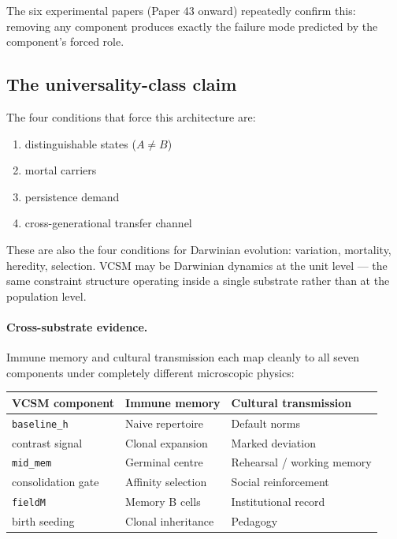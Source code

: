 \documentclass[11pt]{article}
\begin{document}
The six experimental papers (Paper 43 onward) repeatedly confirm this: removing
any component produces exactly the failure mode predicted by the component's forced role.

\subsection{The universality-class claim}

The four conditions that force this architecture are:
\begin{enumerate}
  \item distinguishable states ($A \neq B$)
  \item mortal carriers
  \item persistence demand
  \item cross-generational transfer channel
\end{enumerate}
These are also the four conditions for Darwinian evolution: variation, mortality,
heredity, selection. VCSM may be Darwinian dynamics at the unit level --- the same
constraint structure operating inside a single substrate rather than at the population level.

\paragraph{Cross-substrate evidence.}
Immune memory and cultural transmission each map cleanly to all seven components
under completely different microscopic physics:

\begin{center}
\begin{tabular}{lll}
\toprule
VCSM component & Immune memory & Cultural transmission \\
\midrule
\texttt{baseline\_h}         & Naive repertoire         & Default norms \\
contrast signal              & Clonal expansion         & Marked deviation \\
\texttt{mid\_mem}            & Germinal centre          & Rehearsal / working memory \\
consolidation gate           & Affinity selection       & Social reinforcement \\
\texttt{fieldM}              & Memory B cells           & Institutional record \\
birth seeding                & Clonal inheritance       & Pedagogy \\
\bottomrule
\end{tabular}
\end{center}
\end{document}
